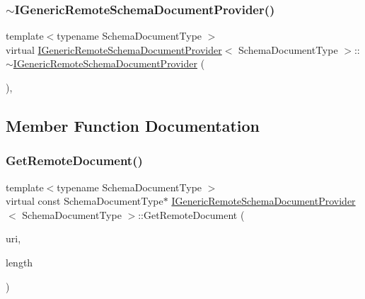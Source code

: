 \subsubsection{\texorpdfstring{$\sim$\+I\+Generic\+Remote\+Schema\+Document\+Provider()}{~IGenericRemoteSchemaDocumentProvider()}}
{\footnotesize\ttfamily template$<$typename Schema\+Document\+Type $>$ \\
virtual \hyperlink{classIGenericRemoteSchemaDocumentProvider}{I\+Generic\+Remote\+Schema\+Document\+Provider}$<$ Schema\+Document\+Type $>$\+::$\sim$\hyperlink{classIGenericRemoteSchemaDocumentProvider}{I\+Generic\+Remote\+Schema\+Document\+Provider} (\begin{DoxyParamCaption}{ }\end{DoxyParamCaption})\hspace{0.3cm}{\ttfamily [inline]}, {\ttfamily [virtual]}}



\subsection{Member Function Documentation}
\mbox{\label{classIGenericRemoteSchemaDocumentProvider_aad112a069dd57fe850fafd04cbb4777b}} 
\subsubsection{\texorpdfstring{Get\+Remote\+Document()}{GetRemoteDocument()}\hspace{0.1cm}{\footnotesize\ttfamily [1/2]}}
{\footnotesize\ttfamily template$<$typename Schema\+Document\+Type $>$ \\
virtual const Schema\+Document\+Type$\ast$ \hyperlink{classIGenericRemoteSchemaDocumentProvider}{I\+Generic\+Remote\+Schema\+Document\+Provider}$<$ Schema\+Document\+Type $>$\+::Get\+Remote\+Document (\begin{DoxyParamCaption}\item[{const \hyperlink{classIGenericRemoteSchemaDocumentProvider_acfcd5492c3df8ff56cd2d84d36cc0ceb}{Ch} $\ast$}]{uri,  }\item[{\hyperlink{rapidjson_8h_a5ed6e6e67250fadbd041127e6386dcb5}{Size\+Type}}]{length }\end{DoxyParamCaption})\hspace{0.3cm}{\ttfamily [pure virtual]}}

